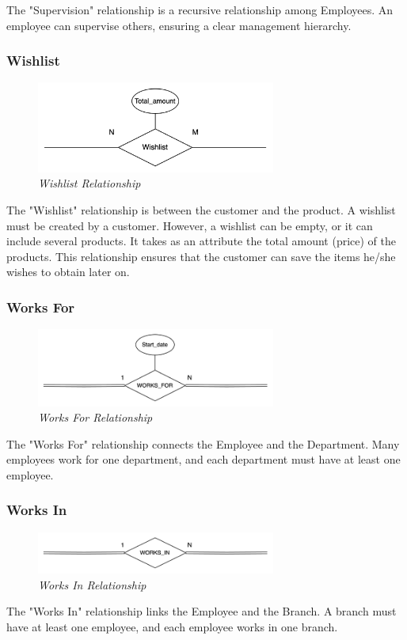 The "Supervision" relationship is a recursive relationship among Employees. An employee can supervise others, ensuring a clear management hierarchy.

\subsubsection{Wishlist}
\begin{figure}[H]
  \centering
  \includegraphics[width=0.7\textwidth]{images/relationships/wishlist.png}
  \caption{\textit{Wishlist Relationship}}
\end{figure}

The "Wishlist" relationship is between the customer and the product. A wishlist must be created by a customer. However, a wishlist can be empty, or it can include several products. It takes as an attribute the total amount (price) of the products. This relationship ensures that the customer can save the items he/she wishes to obtain later on.

\subsubsection{Works For}
\begin{figure}[H]
  \centering
  \includegraphics[width=0.7\textwidth]{images/relationships/works_for.png}
  \caption{\textit{Works For Relationship}}
\end{figure}

The "Works For" relationship connects the Employee and the Department. Many employees work for one department, and each department must have at least one employee.

\subsubsection{Works In}
\begin{figure}[H]
  \centering
  \includegraphics[width=0.7\textwidth]{images/relationships/works_in.png}
  \caption{\textit{Works In Relationship}}
\end{figure}

The "Works In" relationship links the Employee and the Branch. A branch must have at least one employee, and each employee works in one branch.